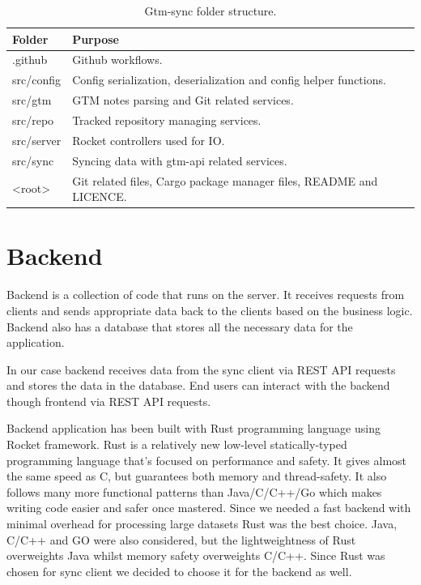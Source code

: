 \begin{table}[h]
    \centering
    \begin{tabular}{ | p{3cm} | p{10cm} |}
        \hline
        \textbf{Folder} & \textbf{Purpose}\\
        \hline
        .github & Github workflows.\\
        \hline
        src/config & Config serialization, deserialization and config helper functions.\\
        \hline
        src/gtm & GTM notes parsing and Git related services.\\
        \hline
        src/repo & Tracked repository managing services.\\
        \hline
        src/server & Rocket controllers used for IO.\\
        \hline
        src/sync & Syncing data with gtm-api related services.\\
        \hline
        <root> & Git related files, Cargo package manager files, README and LICENCE.\\
        \hline
    \end{tabular}
    \caption{Gtm-sync folder structure.}
    \label{tab:gtm-sync-folder-structure}
\end{table}

\section{Backend}\label{sec:backend}
Backend is a collection of code that runs on the server.
It receives requests from clients and sends appropriate data back to the clients based on the business logic.
Backend also has a database that stores all the necessary data for the application.

In our case backend receives data from the sync client via REST API requests and stores the data in the database.
End users can interact with the backend though frontend via REST API requests.

Backend application has been built with Rust programming language using Rocket framework.
Rust is a relatively new low-level statically-typed programming language that's focused on performance and safety.
It gives almost the same speed as C, but guarantees both memory and thread-safety.
It also follows many more functional patterns than Java/C/C++/Go which makes writing code easier and safer once mastered.
Since we needed a fast backend with minimal overhead for processing large datasets Rust was the best choice.
Java, C/C++ and GO were also considered, but the lightweightness of Rust overweights Java whilst memory safety overweights C/C++.
Since Rust was chosen for sync client we decided to choose it for the backend as well.

